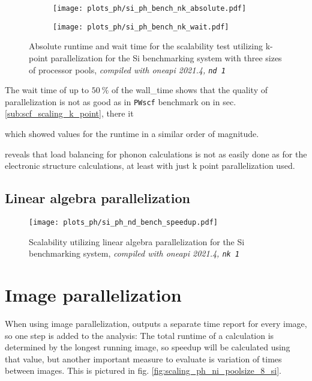 \documentclass[main.tex]{subfiles}
\begin{document}
\begin{figure}[htb!]
    \begin{subfigure}[b]{0.49\textwidth}
        \centering
        \texttt{[image: plots\_ph/si\_ph\_bench\_nk\_absolute.pdf]}
    \end{subfigure}
    \begin{subfigure}[b]{0.49\textwidth}
        \centering
        \texttt{[image: plots\_ph/si\_ph\_bench\_nk\_wait.pdf]}
    \end{subfigure}
    \caption{Absolute runtime and wait time for the scalability test utilizing k-point parallelization for the Si benchmarking system with three sizes of processor pools, \emph{\QE compiled with \gls{oneapi} 2021.4, \texttt{nd 1}}}
    \label{fig:scaling_ph_nk_si_absolute_wait}
\end{figure}


The wait time of up to \(\SI{50}{\percent}\) of the \gls{wall_time} shows that the quality of parallelization is not as good as in \texttt{PWscf} benchmark on \TaS in sec. \ref{sub:scf_scaling_k_point}, there it 

which showed values for the runtime in a similar order of magnitude.


reveals that load balancing for phonon calculations is not as easily done as for the electronic structure calculations, at least with just k point parallelization used.



\subsection{Linear algebra parallelization}



\begin{figure}[htb!]
    \centering
    \texttt{[image: plots\_ph/si\_ph\_nd\_bench\_speedup.pdf]}
    \caption{Scalability utilizing linear algebra parallelization for the Si benchmarking system, \emph{\QE compiled with \gls{oneapi} 2021.4, \texttt{nk 1}}}
    \label{fig:scaling_ph_nd_si}
\end{figure}


\section{Image parallelization}\label{sec:scaling_ph_images}

When using image parallelization, \QE outputs a separate time report for every image, so one step is added to the analysis:
The total runtime of a calculation is determined by the longest running image, so speedup will be calculated using that value, but another important measure to evaluate is variation of times between images.
This is pictured in fig. \ref{fig:scaling_ph_ni_poolsize_8_si}.
\end{document}
